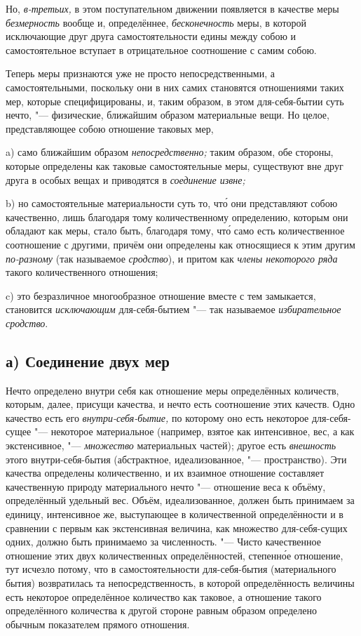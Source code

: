 Но, {\em в-третьих,} в этом поступательном движении появляется в качестве меры
{\em безмерность} вообще и, определённее, {\em бесконечность} меры, в которой
исключающие друг друга самостоятельности едины между собою и самостоятельное
вступает в отрицательное соотношение с самим собою.


Теперь меры признаются уже не просто непосредственными, а самостоятельными,
поскольку они в них самих становятся отношениями таких мер, которые
специфицированы, и, таким образом, в этом для-себя-бытии суть нечто, "---
физические, ближайшим образом материальные вещи. Но целое, представляющее
собою отношение таковых мер,

a) само ближайшим образом {\em непосредственно;} таким образом, обе стороны,
которые определены как таковые самостоятельные меры, существуют вне друг друга
в особых вещах и приводятся в {\em соединение извне;}

b) но самостоятельные материальности суть то, чт\'{о} они представляют собою
качественно, лишь благодаря тому количественному определению, которым они
обладают как меры, стало быть, благодаря тому, чт\'{о} само есть количественное
соотношение с другими, причём они определены как относящиеся к этим другим
{\em по-разному} (так называемое {\em сродство}), и притом как
{\em члены некоторого ряда} такого количественного отношения;

c) это безразличное многообразное отношение вместе с тем замыкается,
становится {\em исключающим} для-себя-бытием "--- так называемое
{\em избирательное сродство}.

\subsection[а) Соединение двух мер]{а) Соединение двух мер}

Нечто определено внутри себя как отношение меры определённых количеств,
которым, далее, присущи качества, и нечто есть соотношение этих качеств. Одно
качество есть его {\em внутри-себя-бытие,} по которому оно есть некоторое
для-себя-сущее "--- некоторое материальное (например, взятое как интенсивное,
вес, а как экстенсивное, "--- {\em множество} материальных частей); другое есть
{\em внешность} этого внутри-себя-бытия (абстрактное, идеализованное, "---
пространство). Эти качества определены количественно, и их взаимное отношение
составляет качественную природу материального нечто "--- отношение веса к
объёму, определённый удельный вес. Объём, идеализованное, должен быть
принимаем за единицу, интенсивное же, выступающее в количественной
определённости и в сравнении с первым как экстенсивная величина, как множество
для-себя-сущих одних, должно быть принимаемо за численность. "--- Чисто
качественное отношение этих двух количественных определённостей, степенн\'{о}е
отношение, тут исчезло потому, что в самостоятельности для-себя-бытия
(материального бытия) возвратилась та непосредственность, в которой
определённость величины есть некоторое определённое количество как таковое, а
отношение такого определённого количества к другой стороне равным образом
определено обычным показателем прямого отношения.

